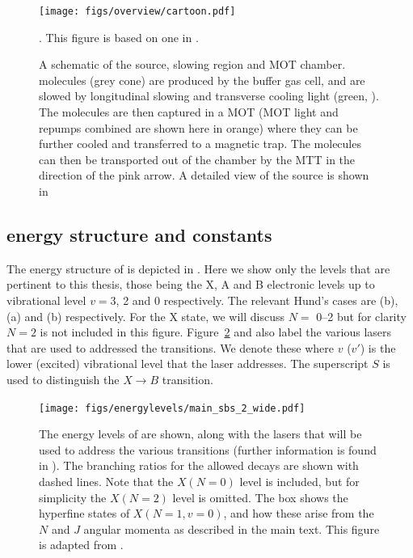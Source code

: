 \begin{figure}
  \centering
  \texttt{[image: figs/overview/cartoon.pdf]}
  \caption{A schematic of the \CaF{} source, slowing region and MOT chamber.
  \CaF{} molecules (grey cone) are produced by the buffer gas cell, and are
  slowed by longitudinal slowing and transverse cooling light (green,
  ). The molecules are then captured in a MOT (MOT light
   and repumps combined are shown here in orange) where
  they can be further cooled and transferred to a magnetic trap. The molecules
  can then be transported out of the chamber by the MTT in the direction of the
  pink arrow. A detailed view of the source is shown in
  }. This figure is based on one in
  .
  \label{overview:fig:CaFcartoon}
\end{figure}

\subsection{\CaF{} energy structure and constants}

The energy structure of \CaF{} is depicted in
. Here we show only the levels that are
pertinent to this thesis, those being the X, A and B electronic levels up to
vibrational level $v=3$, 2 and 0 respectively. The relevant Hund's cases are
(b), (a) and (b) respectively. For the X state, we will discuss $N=$
\numrange{0}{2} but for clarity $N=2$ is not included in this figure.
%
Figure~\ref{overview:fig:CaFenergy} and  also
label the various lasers that are used to addressed the \CaF{} transitions. We
denote these  where $v$ ($v'$) is the lower (excited)
vibrational level that the laser addresses. The superscript $S$ is used to
distinguish the $X\rightarrow B$ transition.

\begin{figure}
  \centering
  \texttt{[image: figs/energylevels/main\_sbs\_2\_wide.pdf]}
  \caption{
    The energy levels of \CaF{} are shown, along with the lasers that will be
    used to address the various transitions (further information is found in
    ). The branching ratios for the allowed
    decays are shown with dashed lines. Note that the $X(N=0)$ level is
    included, but for simplicity the $X(N=2)$ level is omitted. The box shows
    the hyperfine states of $X(N=1, v=0)$, and how these arise from the $N$ and
    $J$ angular momenta as described in the main text. This figure is adapted from
    . 
  }
  \label{overview:fig:CaFenergy}
\end{figure}

